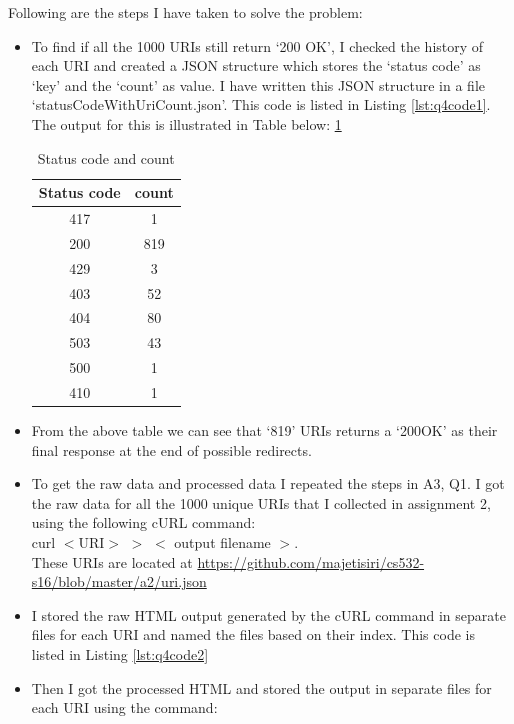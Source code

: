 Following are the steps I have taken to solve the problem:
\begin{itemize}
\item To find if all the 1000 URIs still return `200 OK', I checked the history of each URI and created a JSON structure which stores the `status code' as `key' and the `count' as value. I have written this JSON structure in a file `status\textunderscore CodeWithUriCount.json'. This code is listed in Listing \ref{lst:q4code1}. The output for this is illustrated in Table below: \ref{q4Table1}

\begin{table}
\caption{Status code and count}
\label{q4Table1}
\begin{center}
\hspace{-2cm}
\begin{tabular}{|c|c|}
\hline
 \textbf{Status code} & \textbf{count}\\ \hline
  417  &	1 \\ \hline
 200 &  819 \\ \hline
 429 &	3  \\ \hline
 403 &  52	  \\ \hline
404 & 80\\ \hline
503 & 43\\ \hline
500 & 1\\ \hline
410 & 1\\ \hline
\end{tabular}
\end{center}
\end{table}
\newpage
\item From the above table we can see that `819' URIs returns a `200OK' as their final response at the end of possible redirects.
\item To get the raw data and processed data I repeated the steps in A3, Q1. I got the raw data for all the 1000 unique URIs that I collected in assignment 2, using the following  cURL command: \\
curl $<$URI$>$  $>$ $<$ output filename $>$.\\
These URIs are located at \url{https://github.com/majetisiri/cs532-s16/blob/master/a2/uri.json}
\item I stored the raw HTML output generated by the cURL command in separate files for each URI and named the files based on their index. This code is listed in Listing \ref{lst:q4code2}
\item Then I got the processed HTML and stored the output in separate files for each URI using the command: \\

\end{itemize}
